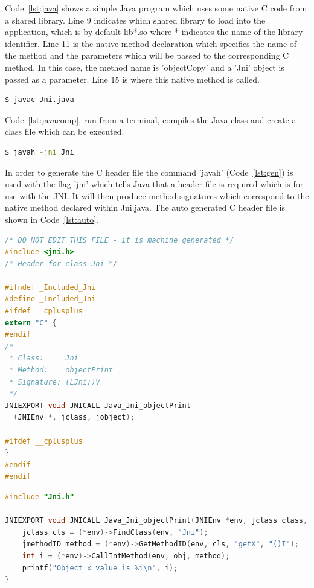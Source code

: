 \documentclass[final_report.tex]{subfiles}
\begin{document}
Code~\ref{lst:java} shows a simple Java program which uses some native C code from a shared library. Line 9 indicates which shared library to load into the application, which is by default lib*.so where * indicates the name of the library identifier. Line 11 is the native method declaration which specifies the name of the method and the parameters which will be passed to the corresponding C method. In this case, the method name is 'objectCopy' and a 'Jni' object is passed as a parameter. Line 15 is where this native method is called.

\begin{lstlisting}[language=sh, caption={Compiling basic Java program}, label=lst:javacomp]
$ javac Jni.java
\end{lstlisting}

Code~\ref{lst:javacomp}, run from a terminal, compiles the Java class and create a class file which can be executed.

\begin{lstlisting}[language=sh, caption={Generating C header file}, label=lst:gen]
$ javah -jni Jni
\end{lstlisting}

In order to generate the C header file the command 'javah' (Code~\ref{lst:gen}) is used with the flag 'jni' which tells Java that a header file is required which is for use with the JNI. It will then produce method signatures which correspond to the native method declared within Jni.java. The auto generated C header file is shown in Code~\ref{lst:auto}.

\begin{lstlisting}[language=C, caption={Auto-generated C header file}, label=lst:auto]
/* DO NOT EDIT THIS FILE - it is machine generated */
#include <jni.h>
/* Header for class Jni */

#ifndef _Included_Jni
#define _Included_Jni
#ifdef __cplusplus
extern "C" {
#endif
/*
 * Class:     Jni
 * Method:    objectPrint
 * Signature: (LJni;)V
 */
JNIEXPORT void JNICALL Java_Jni_objectPrint
  (JNIEnv *, jclass, jobject);

#ifdef __cplusplus
}
#endif
#endif
\end{lstlisting}

\begin{lstlisting}[language=C, caption={C source file corresponding to auto-generated header file}, label=lst:source]
#include "Jni.h"

JNIEXPORT void JNICALL Java_Jni_objectPrint(JNIEnv *env, jclass class, jobject obj) {
	jclass cls = (*env)->FindClass(env, "Jni");
	jmethodID method = (*env)->GetMethodID(env, cls, "getX", "()I");
	int i = (*env)->CallIntMethod(env, obj, method);
	printf("Object x value is %i\n", i);
}
\end{lstlisting}
\end{document}
